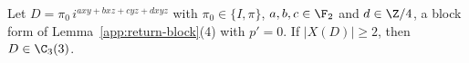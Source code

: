 Let $D=\pi_0\,i^{axy+bxz+cyz+dxyz}$ with $\pi_0\in\{I,\pi\}$, $a,b,c\in\F_2$ and $d\in\Z/4$, a block form of Lemma~\ref{app:return-block}\textup{(4)} with $p'=0$. If $|X(D)|\ge2$, then $D\in\C_3(3)$.
